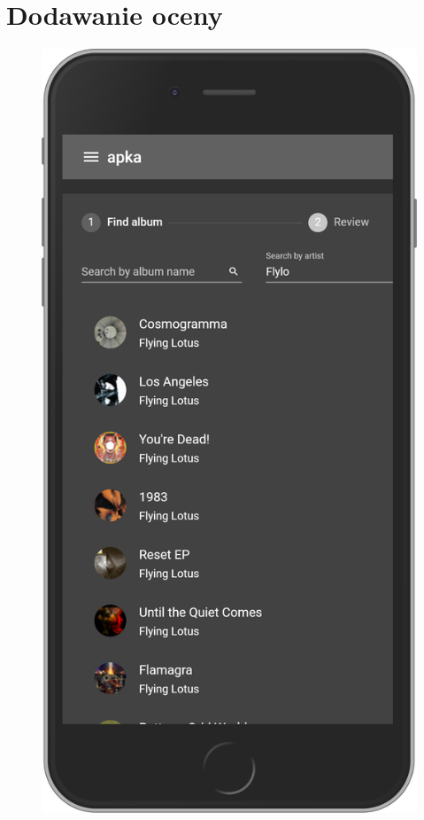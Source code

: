 \section{Dodawanie oceny}
	\begin{figure}[H]
		\centering
		\begin{minipage}{.5\textwidth}
			\includegraphics[width=0.9\linewidth]{rys06/search.png}
		\end{minipage}%

\end{figure}
